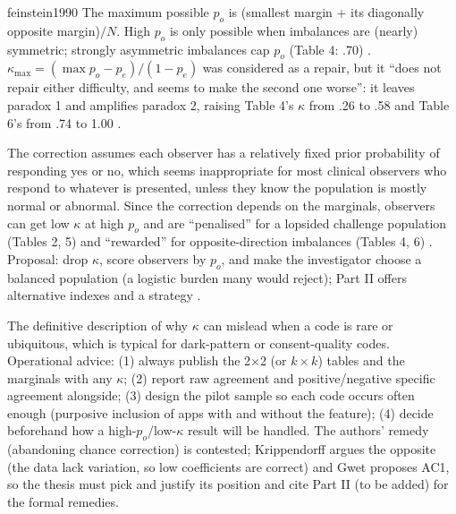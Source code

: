 \begin{papercard}{feinstein1990}
 The maximum possible $p_o$ is (smallest margin + its diagonally opposite margin)$/N$. High $p_o$ is only possible when imbalances are (nearly) symmetric; strongly asymmetric imbalances cap $p_o$ (Table 4: .70) . $\kappa_{\max}=(\max p_o-p_e)/(1-p_e)$ was considered as a repair, but it ``does not repair either difficulty, and seems to make the second one worse'': it leaves paradox 1 and amplifies paradox 2, raising Table 4's $\kappa$ from .26 to .58 and Table 6's from .74 to 1.00 .

 The correction assumes each observer has a relatively fixed prior probability of responding yes or no, which seems inappropriate for most clinical observers who respond to whatever is presented, unless they know the population is mostly normal or abnormal. Since the correction depends on the marginals, observers can get low $\kappa$ at high $p_o$ and are ``penalised'' for a lopsided challenge population (Tables 2, 5) and ``rewarded'' for opposite-direction imbalances (Tables 4, 6) . Proposal: drop $\kappa$, score observers by $p_o$, and make the investigator choose a balanced population (a logistic burden many would reject); Part II offers alternative indexes and a strategy .

 The definitive description of why $\kappa$ can mislead when a code is rare or ubiquitous, which is typical for dark-pattern or consent-quality codes. Operational advice: (1) always publish the 2$\times$2 (or $k\times k$) tables and the marginals with any $\kappa$; (2) report raw agreement and positive/negative specific agreement alongside; (3) design the pilot sample so each code occurs often enough (purposive inclusion of apps with and without the feature); (4) decide beforehand how a high-$p_o$/low-$\kappa$ result will be handled. The authors' remedy (abandoning chance correction) is contested; Krippendorff argues the opposite (the data lack variation, so low coefficients are correct) and Gwet proposes AC1, so the thesis must pick and justify its position and cite Part II (to be added) for the formal remedies.
\end{papercard}
